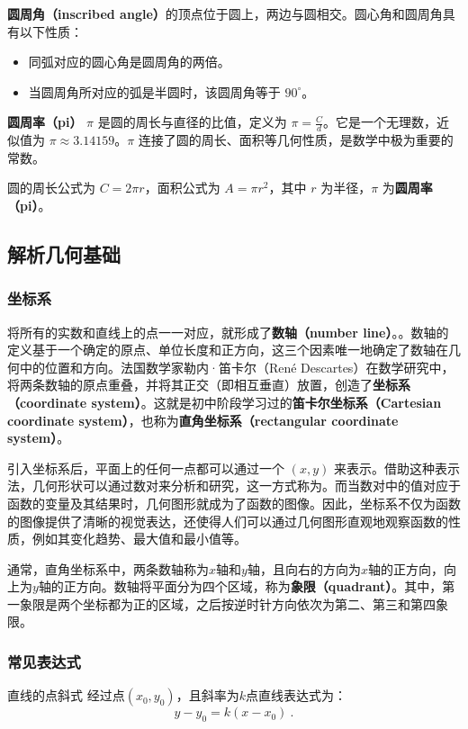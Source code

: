 \textbf{圆周角（inscribed angle）}的顶点位于圆上，两边与圆相交。圆心角和圆周角具有以下性质：
\begin{itemize}
\item 同弧对应的圆心角是圆周角的两倍。
\item 当圆周角所对应的弧是半圆时，该圆周角等于 $90^\circ$。
\end{itemize}
\textbf{圆周率（pi）} $\pi$ 是圆的周长与直径的比值，定义为 $\pi = \frac{C}{d}$。它是一个无理数，近似值为 $\pi \approx 3.14159$。$\pi$ 连接了圆的周长、面积等几何性质，是数学中极为重要的常数。

圆的周长公式为 $C = 2\pi r$，面积公式为 $A = \pi r^2$，其中 $r$ 为半径，$\pi$ 为\textbf{圆周率（pi）}。

\subsection{解析几何基础}

\subsubsection{坐标系}
将所有的实数和直线上的点一一对应，就形成了\textbf{数轴（number line）}。。数轴的定义基于一个确定的原点、单位长度和正方向，这三个因素唯一地确定了数轴在几何中的位置和方向。法国数学家勒内·笛卡尔（René Descartes）在数学研究中，将两条数轴的原点重叠，并将其正交（即相互垂直）放置，创造了\textbf{坐标系（coordinate system）}。这就是初中阶段学习过的\textbf{笛卡尔坐标系（Cartesian coordinate system）}，也称为\textbf{直角坐标系（rectangular coordinate system）}。

引入坐标系后，平面上的任何一点都可以通过一个 $(x, y)$ 来表示。借助这种表示法，几何形状可以通过数对来分析和研究，这一方式称为。而当数对中的值对应于函数的变量及其结果时，几何图形就成为了函数的图像。因此，坐标系不仅为函数的图像提供了清晰的视觉表达，还使得人们可以通过几何图形直观地观察函数的性质，例如其变化趋势、最大值和最小值等。

通常，直角坐标系中，两条数轴称为$x$轴和$y$轴，且向右的方向为$x$轴的正方向，向上为$y$轴的正方向。数轴将平面分为四个区域，称为\textbf{象限（quadrant）}。其中，第一象限是两个坐标都为正的区域，之后按逆时针方向依次为第二、第三和第四象限。

\subsubsection{常见表达式}

\begin{definition}{直线的点斜式}\label{def_HsGeBa_1}
经过点$(x_0,y_0)$，且斜率为$k$点直线表达式为：
\begin{equation}
y-y_0=k(x-x_0)~.
\end{equation}
\end{definition}

